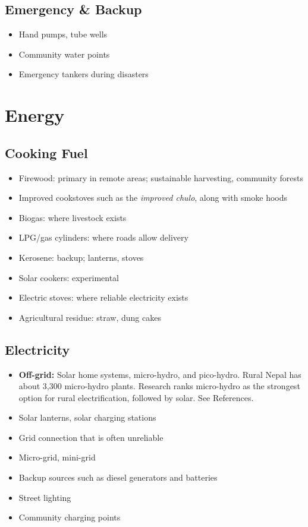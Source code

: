 \documentclass[11pt,a4paper]{article}
\begin{document}
\subsection{Emergency \& Backup}
\begin{itemize}
    \item Hand pumps, tube wells
    \item Community water points
    \item Emergency tankers during disasters
\end{itemize}

\section{Energy}

\subsection{Cooking Fuel}
\begin{itemize}
    \item Firewood: primary in remote areas; sustainable harvesting, community forests
    \item Improved cookstoves such as the \textit{improved chulo}, along with smoke hoods
    \item Biogas: where livestock exists
    \item LPG/gas cylinders: where roads allow delivery
    \item Kerosene: backup; lanterns, stoves
    \item Solar cookers: experimental
    \item Electric stoves: where reliable electricity exists
    \item Agricultural residue: straw, dung cakes
\end{itemize}

\subsection{Electricity}
\begin{itemize}
    \item \textbf{Off-grid:} Solar home systems, micro-hydro, and pico-hydro. Rural Nepal has about 3,300 micro-hydro plants. 
    Research ranks micro-hydro as the strongest option for rural electrification, followed by solar. See References.
    \item Solar lanterns, solar charging stations
    \item Grid connection that is often unreliable
    \item Micro-grid, mini-grid
    \item Backup sources such as diesel generators and batteries
    \item Street lighting
    \item Community charging points
\end{itemize}
\end{document}
